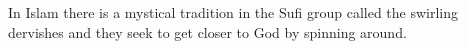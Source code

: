 \documentclass{article}
\begin{document}
In Islam there is a mystical tradition in the Sufi group called the swirling dervishes and they seek to get closer to God by spinning around.
\end{document}
